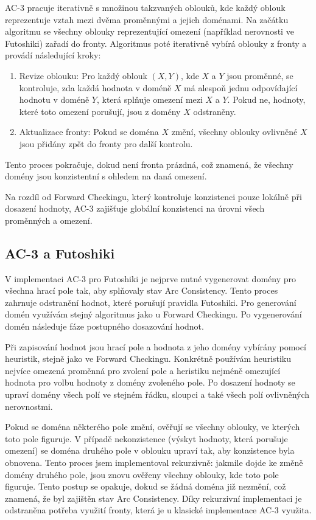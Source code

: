 AC-3 pracuje iterativně s množinou takzvaných oblouků, kde každý oblouk
reprezentuje vztah mezi dvěma proměnnými a jejich doménami. Na začátku
algoritmu se všechny oblouky reprezentující omezení (například nerovnosti ve
Futoshiki) zařadí do fronty. Algoritmus poté iterativně vybírá oblouky z fronty
a provádí následující kroky:
\begin{enumerate}
    \item Revize oblouku: Pro každý oblouk \((X,Y)\), kde \(X\) a \(Y\) jsou
        proměnné, se kontroluje, zda každá hodnota v doméně \(X\) má alespoň
        jednu odpovídající hodnotu v doméně \(Y\), která splňuje omezení mezi
        \(X\) a \(Y\). Pokud ne, hodnoty, které toto omezení porušují, jsou z
        domény \(X\) odstraněny.
    \item Aktualizace fronty: Pokud se doména \(X\) změní, všechny oblouky
        ovlivněné \(X\) jsou přidány zpět do fronty pro další kontrolu.
\end{enumerate}

Tento proces pokračuje, dokud není fronta prázdná, což znamená, že všechny
domény jsou konzistentní s ohledem na daná omezení.

Na rozdíl od Forward Checkingu, který kontroluje konzistenci pouze lokálně při
dosazení hodnoty, AC-3 zajišťuje globální konzistenci na úrovni všech
proměnných a omezení.

\subsection{AC-3 a Futoshiki}

V implementaci AC-3 pro Futoshiki je nejprve nutné vygenerovat domény pro
všechna hrací pole tak, aby splňovaly stav Arc Consistency. Tento proces
zahrnuje odstranění hodnot, které porušují pravidla Futoshiki. Pro generování
domén využívám stejný algoritmus jako u Forward Checkingu. Po vygenerování
domén následuje fáze postupného dosazování hodnot.

Při zapisování hodnot jsou hrací pole a hodnota z jeho domény vybírány pomocí
heuristik, stejně jako ve Forward Checkingu. Konkrétně používám heuristiku
nejvíce omezená proměnná pro zvolení pole a heristiku nejméně omezující hodnota
pro volbu hodnoty z domény zvoleného pole. Po dosazení hodnoty se upraví domény
všech polí ve stejném řádku, sloupci a také všech polí ovlivněných nerovnostmi.

Pokud se doména některého pole změní, ověřují se všechny oblouky, ve kterých
toto pole figuruje. V případě nekonzistence (výskyt hodnoty, která porušuje
omezení) se doména druhého pole v oblouku upraví tak, aby konzistence byla
obnovena. Tento proces jsem implementoval rekurzivně: jakmile dojde ke změně
domény druhého pole, jsou znovu ověřeny všechny oblouky, kde toto pole
figuruje. Tento postup se opakuje, dokud se žádná doména již nezmění, což
znamená, že byl zajištěn stav Arc Consistency. Díky rekurzivní implementaci je
odstraněna potřeba využití fronty, která je u klasické implementace AC-3
využita.

